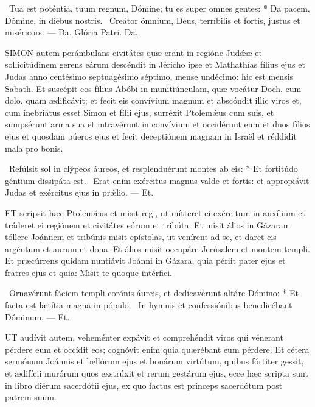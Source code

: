 \R\ Tua est poténtia, tuum regnum, Dómine; tu es super omnes gentes: * Da pacem, Dómine, in diébus nostris. \V\ Creátor ómnium, Deus, terríbilis et fortis, justus et miséricors. — Da. Glória Patri. Da.




\lettrine[lines=2]{S}{IMON} autem perámbulans civitátes quæ erant in regióne Judǽæ et sollicitúdinem gerens eárum descéndit in Jéricho ipse et Mathathías fílius ejus et Judas anno centésimo septuagésimo séptimo, mense undécimo: hic est mensis Sabath. Et suscépit eos fílius Abóbi in munitiúnculam, quæ vocátur Doch, cum dolo, quam ædificávit; et fecit eis convívium magnum et abscóndit illic viros et, cum inebriátus esset Simon et fílii ejus, surréxit Ptolemǽus cum suis, et sumpsérunt arma sua et intravérunt in convívium et occidérunt eum et duos fílios ejus et quosdam púeros ejus et fecit deceptiónem magnam in Israël et réddidit mala pro bonis.

\R\ Refúlsit sol in clýpeos áureos, et resplenduérunt montes ab eis: * Et fortitúdo géntium dissipáta est. \V\ Erat enim exércitus magnus valde et fortis: et appropiávit Judas et exércitus ejus in prǽlio. — Et.


\lettrine[lines=2]{E}{T} scripsit hæc Ptolemǽus et misit regi, ut mítteret ei exércitum in auxílium et tráderet ei regiónem et civitátes eórum et tribúta. Et misit álios in Gázaram tóllere Joánnem et tribúnis misit epístolas, ut venírent ad se, et daret eis argéntum et aurum et dona. Et álios misit occupáre Jerúsalem et montem templi. Et præcúrrens quidam nuntiávit Joánni in Gázara, quia périit pater ejus et fratres ejus et quia: Misit te quoque intérfici.

\R\ Ornavérunt fáciem templi corónis áureis, et dedicavérunt altáre Dómino: * Et facta est lætítia magna in pópulo. \V\ In hymnis et confessiónibus benedicébant Dóminum. — Et.



\lettrine[lines=2]{U}{T} audívit autem, veheménter expávit et comprehéndit viros qui vénerant pérdere eum et occídit eos; cognóvit enim quia quærébant eum pérdere. Et cétera sermónum Joánnis et bellórum ejus et bonárum virtútum, quibus fórtiter gessit, et ædifícii murórum quos exstrúxit et rerum gestárum ejus, ecce hæc scripta sunt in libro diérum sacerdótii ejus, ex quo factus est princeps sacerdótum post patrem suum.

